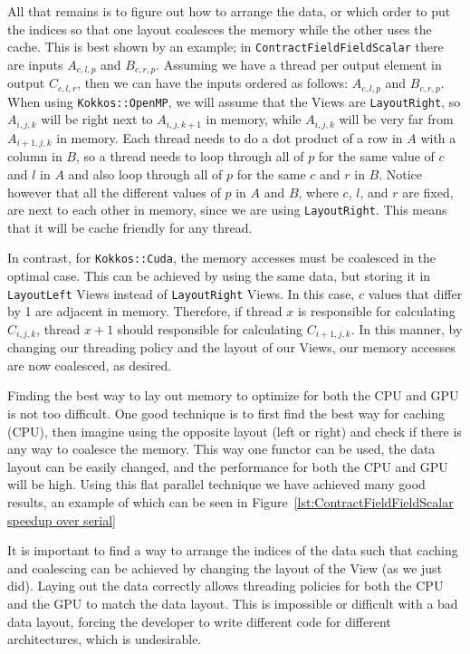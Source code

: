 All that remains is to figure out how to arrange the data, or which order to put
the indices so that one layout coalesces the memory while the other uses the
cache. This is best shown by an example; in \texttt{ContractFieldFieldScalar}
there are inputs $A_{c, l, p}$ and $B_{c, r, p}$. Assuming we have a thread per
output element in output $C_{c, l, r}$, then we can have the inputs ordered as
follows: $A_{c, l, p}$ and $B_{c, r, p}$. When using \texttt{Kokkos::OpenMP}, we
will assume that the Views are \texttt{LayoutRight}, so $A_{i, j, k}$ will be
right next to $A_{i, j, k+1}$ in memory, while $A_{i, j, k}$ will be very far
from $A_{i+1, j, k}$ in memory. Each thread needs to do a dot product of a row
in $A$ with a column in $B$, so a thread needs to loop through all of $p$ for
the same value of $c$ and $l$ in $A$ and also loop through all of $p$ for the
same $c$ and $r$ in $B$. Notice however that all the different values of $p$ in
$A$ and $B$, where $c$, $l$, and $r$ are fixed, are next to each other in
memory, since we are using \texttt{LayoutRight}. This means that it will be
cache friendly for any thread. 

In contrast, for \texttt{Kokkos::Cuda}, the memory accesses must be coalesced in
the optimal case.  This can be achieved by using the same data, but storing it
in \texttt{LayoutLeft} Views instead of \texttt{LayoutRight} Views. In this
case, $c$ values that differ by 1 are adjacent in memory.  Therefore, if thread
$x$ is responsible for calculating $C_{i, j, k}$, thread $x+1$ should
responsible for calculating $C_{i+1, j, k}$. In this manner, by changing our
threading policy and the layout of our Views, our memory accesses are now
coalesced, as desired. 

Finding the best way to lay out memory to optimize for both the CPU and GPU is
not too difficult. One good technique is to first find the best way for caching (CPU),
then imagine using the opposite layout (left or right) and check if there is
any way to coalesce the memory. This way one functor can be used, the data
layout can be easily changed, and the performance for both the CPU and GPU will
be high. Using this flat parallel technique we have achieved many good results,
an example of which can be seen in Figure~\ref{lst:ContractFieldFieldScalar
speedup over serial}

It is important to find a way to arrange the indices of the data such that
caching and coalescing can be achieved by changing the layout of the View (as we
just did).  Laying out the data correctly allows threading policies for both the
CPU and the GPU to match the data layout.  This is impossible or difficult with
a bad data layout, forcing the developer to write different code for
different architectures, which is undesirable.

